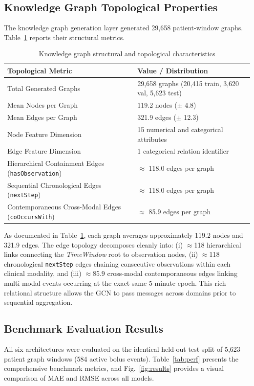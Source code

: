 \documentclass[10pt,a4paper]{article}
\begin{document}
\subsection{Knowledge Graph Topological Properties}
The knowledge graph generation layer generated 29,658 patient-window graphs. Table~\ref{tab:kg} reports their structural metrics.

\begin{table}[htbp]
\caption{Knowledge graph structural and topological characteristics}\label{tab:kg}
\small
\begin{tabular*}{\textwidth}{@{\extracolsep{\fill}}ll@{}}
\toprule
Topological Metric & Value / Distribution \\
\midrule
Total Generated Graphs & 29,658 graphs (20,415 train, 3,620 val, 5,623 test) \\
Mean Nodes per Graph & 119.2 nodes ($\pm$ 4.8) \\
Mean Edges per Graph & 321.9 edges ($\pm$ 12.3) \\
Node Feature Dimension & 15 numerical and categorical attributes \\
Edge Feature Dimension & 1 categorical relation identifier \\
Hierarchical Containment Edges (\texttt{hasObservation}) & $\approx$ 118.0 edges per graph \\
Sequential Chronological Edges (\texttt{nextStep}) & $\approx$ 118.0 edges per graph \\
Contemporaneous Cross-Modal Edges (\texttt{coOccursWith}) & $\approx$ 85.9 edges per graph \\
\bottomrule
\end{tabular*}
\end{table}

As documented in Table~\ref{tab:kg}, each graph averages approximately 119.2 nodes and 321.9 edges. The edge topology decomposes cleanly into: (i) $\approx$118 hierarchical links connecting the \textit{TimeWindow} root to observation nodes, (ii) $\approx$118 chronological \texttt{nextStep} edges chaining consecutive observations within each clinical modality, and (iii) $\approx$85.9 cross-modal contemporaneous edges linking multi-modal events occurring at the exact same 5-minute epoch. This rich relational structure allows the GCN to pass messages across domains prior to sequential aggregation.

\subsection{Benchmark Evaluation Results}
All six architectures were evaluated on the identical held-out test split of 5,623 patient graph windows (584 active bolus events). Table~\ref{tab:perf} presents the comprehensive benchmark metrics, and Fig.~\ref{fig:results} provides a visual comparison of MAE and RMSE across all models.
\end{document}
